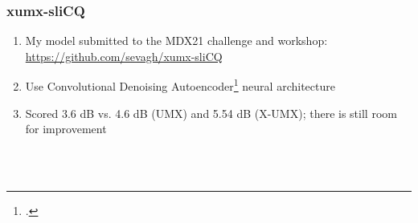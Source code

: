 \documentclass[usenames,dvipsnames]{beamer}
\begin{document}
\begin{frame}
	\frametitle{xumx-sliCQ}
	\begin{enumerate}
		\item
			My model submitted to the MDX21 challenge and workshop: \url{https://github.com/sevagh/xumx-sliCQ}
		\item
			Use Convolutional Denoising Autoencoder\footcite{plumbley1, plumbley2} neural architecture
		\item
			Scored 3.6 dB vs. 4.6 dB (UMX) and 5.54 dB (X-UMX); there is still room for improvement
	\end{enumerate}
	\begin{figure}[ht]
		\centering
		\vspace{-1.15em}
		\\
		\vspace{-0.5em}
		\\
		\vspace{-0.5em}
	\end{figure}
\end{frame}
\end{document}
